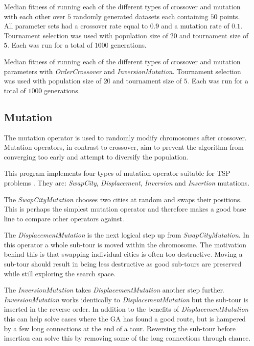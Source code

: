 \documentclass[journal]{IEEEtran}
\begin{document}
\begin{table}[t]
\centering

\caption{Median fitness of running each of the different types of crossover and mutation with each other over $5$ randomly generated datasets each containing $50$ points. All parameter sets had a crossover rate equal to $0.9$ and a mutation rate of $0.1$. Tournament selection was used with population size of $20$ and tournament size of $5$. Each was run for a total of $1000$ generations.}
\label{table:cross-vs-mutate}
\end{table}

\begin{table}[t]
\centering

\caption{Median fitness of running each of the different types of crossover and mutation parameters with \textit{OrderCrossover} and \textit{InversionMutation}. Tournament selection was used with population size of $20$ and tournament size of $5$. Each was run for a total of $1000$ generations.}
\label{table:cross-vs-mutate-params}
\end{table}


\subsection{Mutation}
The mutation operator is used to randomly modify chromosomes after crossover. Mutation operators, in contrast to crossover, aim to prevent the algorithm from converging too early and attempt to diversify the population.

This program implements four types of mutation operator suitable for TSP problems \cite{larranaga1999genetic}. They are: \textit{SwapCity}, \textit{Displacement}, \textit{Inversion} and \textit{Insertion} mutations.

The \textit{SwapCityMutation} chooses two cities at random and swaps their positions. This is perhaps the simplest mutation operator and therefore makes a good base line to compare other operators against.

The \textit{DisplacementMutation} is the next logical step up from \textit{SwapCityMutation}. In this operator a whole sub-tour is moved within the chromosome. The motivation behind this is that swapping individual cities is often too destructive. Moving a sub-tour should result in being less destructive as good sub-tours are preserved while still exploring the search space.

The \textit{InversionMutation} takes \textit{DisplacementMutation} another step further. \textit{InversionMutation} works identically to  \textit{DisplacementMutation} but the sub-tour is inserted in the reverse order. In addition to the benefits of \textit{DisplacementMutation} this can help solve cases where the GA has found a good route, but is hampered by a few long connections at the end of a tour. Reversing the sub-tour before insertion can solve this by removing some of the long connections through chance.
\end{document}
